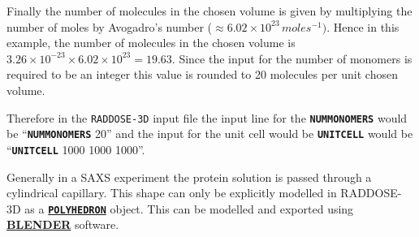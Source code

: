 \documentclass[a4paper]{article}
\newcommand{\RD}{\texttt{RADDOSE-3D}\xspace}
\newcommand{\Keyword}[1]{\texttt{\textbf{#1}}\xspace}
\begin{document}
Finally the number of molecules in the chosen volume is given by multiplying the number of moles by Avogadro's number ($\approx 6.02 \times 10^{23}\,moles^{-1})$. Hence in this example, the number of molecules in the chosen volume is $3.26 \times 10^{-23} \times 6.02 \times 10^{23} = 19.63$. Since the input for the number of monomers is required to be an integer this value is rounded to 20 molecules per unit chosen volume.

Therefore in the \RD input file the input line for the \Keyword{NUMMONOMERS} would be ``\Keyword{NUMMONOMERS} 20'' and the input for the unit cell would be \Keyword{UNITCELL} would be ``\Keyword{UNITCELL} 1000 1000 1000''.

Generally in a SAXS experiment the protein solution is passed through a cylindrical capillary. This shape can only be explicitly modelled in RADDOSE-3D as a \hyperref[crystaltype]{\Keyword{POLYHEDRON}} object. This can be modelled and exported using \href{http://www.blender.org/}{\textbf{BLENDER}} software.
\end{document}
